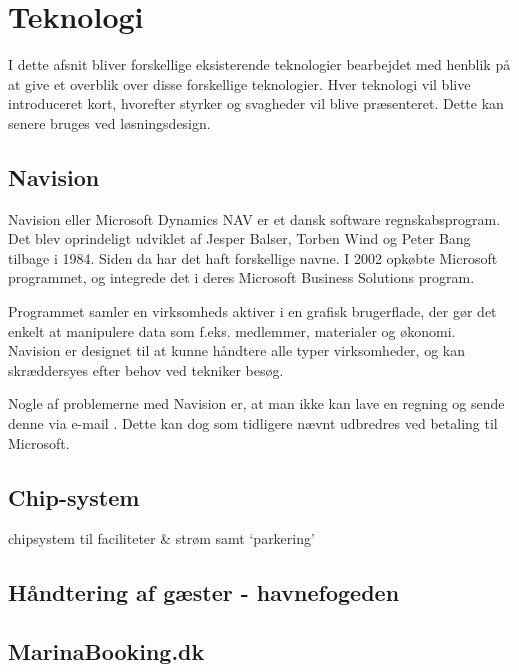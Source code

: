 \section{Teknologi} %
\label{sec:Teknologi}

I dette afsnit bliver forskellige eksisterende teknologier bearbejdet med henblik på at give et overblik over disse forskellige teknologier. Hver teknologi vil blive introduceret kort, hvorefter styrker og svagheder vil blive præsenteret. Dette kan senere bruges ved løsningsdesign.


\subsection{Navision} %
\label{sub:Navision}

Navision eller Microsoft Dynamics NAV er et dansk software regnskabsprogram. Det blev oprindeligt udviklet af Jesper Balser, Torben Wind og Peter Bang tilbage i 1984. Siden da har det haft forskellige navne. I 2002 opkøbte Microsoft programmet, og integrede det i deres Microsoft Business Solutions program.

Programmet samler en virksomheds aktiver i en grafisk brugerflade, der gør det enkelt at manipulere data som f.eks. medlemmer, materialer og økonomi. Navision er designet til at kunne håndtere alle typer virksomheder, og kan skræddersyes efter behov ved tekniker besøg.

Nogle af problemerne med Navision er, at man ikke kan lave en regning og sende denne via e-mail \cite{int_vb_sl}. Dette kan dog som tidligere nævnt udbredres ved betaling til Microsoft.


\subsection{Chip-system} %
\label{sub:Chip}


chipsystem til faciliteter \& strøm samt `parkering'

\subsection{Håndtering af gæster - havnefogeden} %
\label{sub:havnefogeden}


\subsection{MarinaBooking.dk} %
\label{sub:MarinaBooking.dk}

